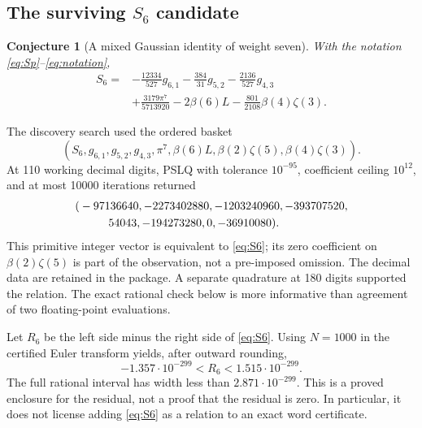\documentclass[11pt,letterpaper]{article}
\numberwithin{equation}{section}
\newtheorem{conjecture}[theorem]{Conjecture}
\theoremstyle{definition}
\begin{document}
\subsection{The surviving \texorpdfstring{$S_6$}{S6} candidate}
\begin{conjecture}[A mixed Gaussian identity of weight seven]\label{conj:S6}
With the notation \eqref{eq:Sp}--\eqref{eq:notation},
\begin{equation}
 \boxed{\begin{aligned}
 S_6={}&-\frac{12334}{527}g_{6,1}-\frac{384}{31}g_{5,2}
        -\frac{2136}{527}g_{4,3}\\
        &+\frac{3179\pi^7}{5713920}
        -2\beta(6)L-\frac{801}{2108}\beta(4)\zeta(3).\end{aligned}}
 \label{eq:S6}
\end{equation}
\end{conjecture}

The discovery search used the ordered basket
\begin{equation}
 (S_6,g_{6,1},g_{5,2},g_{4,3},\pi^7,
          \beta(6)L,\beta(2)\zeta(5),\beta(4)\zeta(3)).
 \label{eq:S6basket}
\end{equation}
At 110 working decimal digits, PSLQ with tolerance $10^{-95}$,
coefficient ceiling $10^{12}$, and at most 10000 iterations returned
\begin{equation}
\begin{split}
 (&-97136640,-2273402880,-1203240960,-393707520,\\
  &\hspace{9mm}54043,-194273280,0,-36910080).
\end{split}
\label{eq:S6vector}
\end{equation}
This primitive integer vector is equivalent to \eqref{eq:S6}; its
zero coefficient on $\beta(2)\zeta(5)$ is part of the observation,
not a pre-imposed omission. The decimal data are retained in the
package. A separate quadrature at 180 digits supported the relation.
The exact rational check below is more informative than agreement of
two floating-point evaluations.

Let $R_6$ be the left side minus the right side of \eqref{eq:S6}.
Using $N=1000$ in the certified Euler transform yields, after outward
rounding,
\begin{equation}
 -1.357\cdot10^{-299}<R_6<1.515\cdot10^{-299}.
 \label{eq:S6enclosure}
\end{equation}
The full rational interval has width less than
$2.871\cdot10^{-299}$. This is a proved enclosure for the residual,
not a proof that the residual is zero. In particular, it does not license
adding \eqref{eq:S6} as a relation to an exact word certificate.
\end{document}
